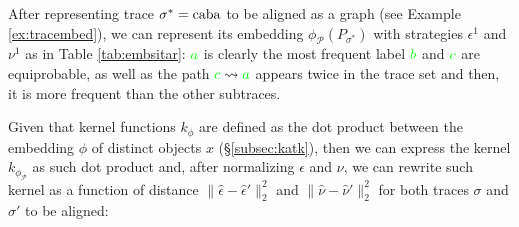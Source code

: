 \begin{example}
{After representing trace $\sigma^*=\textup{caba}$ to be aligned as a graph (see Example \ref{ex:tracembed}), we can represent its}
embedding $\phi_{\mathcal{P}}(P_{\sigma^*})$ with strategies $\epsilon^1$ and $\nu^1$ %
{as} in Table \ref{tab:embsitar}: ${\color{green}a}$ is clearly the most frequent label ${\color{green}b}$ and ${\color{green}c}$ are equiprobable, as well as the path ${\color{green}c}\rightsquigarrow {\color{green}a}$ appears twice in the trace set and then, it is more frequent than the other subtraces.
\end{example}


Given that kernel functions $k_\phi$ are defined as the dot product between the embedding $\phi$ of distinct objects $x$ (\S\ref{subsec:katk}), then we can express the kernel $k_{\phi_{\mathcal{P}}}$ as such dot product and, after normalizing $\epsilon$ and $\nu$, we can rewrite such kernel
{as a function of distance  $\|\hat{\epsilon}-\hat{\epsilon}'\|_2^2$ and $\|\hat{\nu}-\hat{\nu}'\|_2^2$ for both traces $\sigma$ and $\sigma'$ to be aligned:}

